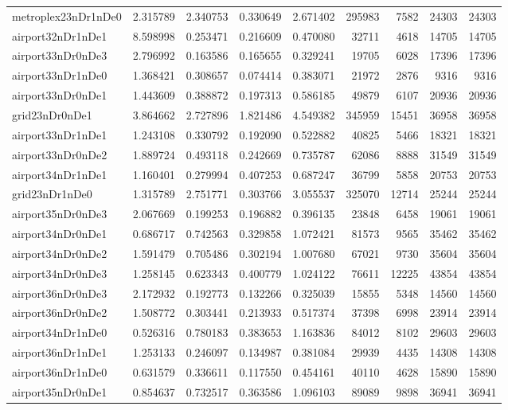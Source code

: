 \begin{longtable}{|l|r|r|r|r|r|r|r|r|}
metroplex23nDr1nDe0 & 2.315789 & 2.340753 & 0.330649 & 2.671402 & 295983 & 7582 & 24303 & 24303 \\
airport32nDr1nDe1 & 8.598998 & 0.253471 & 0.216609 & 0.470080 & 32711 & 4618 & 14705 & 14705 \\
airport33nDr0nDe3 & 2.796992 & 0.163586 & 0.165655 & 0.329241 & 19705 & 6028 & 17396 & 17396 \\
airport33nDr1nDe0 & 1.368421 & 0.308657 & 0.074414 & 0.383071 & 21972 & 2876 & 9316 & 9316 \\
airport33nDr0nDe1 & 1.443609 & 0.388872 & 0.197313 & 0.586185 & 49879 & 6107 & 20936 & 20936 \\
grid23nDr0nDe1 & 3.864662 & 2.727896 & 1.821486 & 4.549382 & 345959 & 15451 & 36958 & 36958 \\
airport33nDr1nDe1 & 1.243108 & 0.330792 & 0.192090 & 0.522882 & 40825 & 5466 & 18321 & 18321 \\
airport33nDr0nDe2 & 1.889724 & 0.493118 & 0.242669 & 0.735787 & 62086 & 8888 & 31549 & 31549 \\
airport34nDr1nDe1 & 1.160401 & 0.279994 & 0.407253 & 0.687247 & 36799 & 5858 & 20753 & 20753 \\
grid23nDr1nDe0 & 1.315789 & 2.751771 & 0.303766 & 3.055537 & 325070 & 12714 & 25244 & 25244 \\
airport35nDr0nDe3 & 2.067669 & 0.199253 & 0.196882 & 0.396135 & 23848 & 6458 & 19061 & 19061 \\
airport34nDr0nDe1 & 0.686717 & 0.742563 & 0.329858 & 1.072421 & 81573 & 9565 & 35462 & 35462 \\
airport34nDr0nDe2 & 1.591479 & 0.705486 & 0.302194 & 1.007680 & 67021 & 9730 & 35604 & 35604 \\
airport34nDr0nDe3 & 1.258145 & 0.623343 & 0.400779 & 1.024122 & 76611 & 12225 & 43854 & 43854 \\
airport36nDr0nDe3 & 2.172932 & 0.192773 & 0.132266 & 0.325039 & 15855 & 5348 & 14560 & 14560 \\
airport36nDr0nDe2 & 1.508772 & 0.303441 & 0.213933 & 0.517374 & 37398 & 6998 & 23914 & 23914 \\
airport34nDr1nDe0 & 0.526316 & 0.780183 & 0.383653 & 1.163836 & 84012 & 8102 & 29603 & 29603 \\
airport36nDr1nDe1 & 1.253133 & 0.246097 & 0.134987 & 0.381084 & 29939 & 4435 & 14308 & 14308 \\
airport36nDr1nDe0 & 0.631579 & 0.336611 & 0.117550 & 0.454161 & 40110 & 4628 & 15890 & 15890 \\
airport35nDr0nDe1 & 0.854637 & 0.732517 & 0.363586 & 1.096103 & 89089 & 9898 & 36941 & 36941 \\

\end{longtable}

